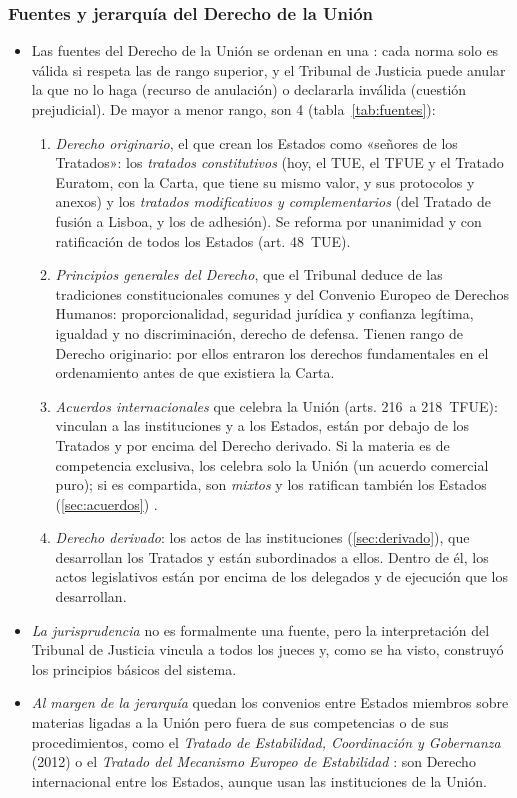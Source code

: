 \documentclass[11pt]{article}
\begin{document}
\subsubsection{Fuentes y jerarquía del Derecho de la Unión}\label{sec:fuentes}

\begin{itemize}
\item Las fuentes del Derecho de la Unión se ordenan en una : cada norma solo es válida si respeta las de rango superior, y el Tribunal de Justicia puede anular la que no lo haga (recurso de anulación) o declararla inválida (cuestión prejudicial). De mayor a menor rango, son 4 (tabla~\ref{tab:fuentes}):
  \begin{enumerate}
  \item \emph{Derecho originario}, el que crean los Estados como «señores de los Tratados»: los \emph{tratados constitutivos} (hoy, el TUE, el TFUE y el Tratado Euratom, con la Carta, que tiene su mismo valor, y sus protocolos y anexos) y los \emph{tratados modificativos y complementarios} (del Tratado de fusión a Lisboa, y los de adhesión). Se reforma por unanimidad y con ratificación de todos los Estados (art. 48~TUE).
  \item \emph{Principios generales del Derecho}, que el Tribunal deduce de las tradiciones constitucionales comunes y del Convenio Europeo de Derechos Humanos: proporcionalidad, seguridad jurídica y confianza legítima, igualdad y no discriminación, derecho de defensa. Tienen rango de Derecho originario: por ellos entraron los derechos fundamentales en el ordenamiento antes de que existiera la Carta.
  \item \emph{Acuerdos internacionales} que celebra la Unión (arts. 216~a 218~TFUE): vinculan a las instituciones y a los Estados, están por debajo de los Tratados y por encima del Derecho derivado. Si la materia es de competencia exclusiva, los celebra solo la Unión (un acuerdo comercial puro); si es compartida, son \emph{mixtos} y los ratifican también los Estados (\ref{sec:acuerdos}) .
  \item \emph{Derecho derivado}: los actos de las instituciones (\ref{sec:derivado}), que desarrollan los Tratados y están subordinados a ellos. Dentro de él, los actos legislativos están por encima de los delegados y de ejecución que los desarrollan.
  \end{enumerate}
\item \emph{La jurisprudencia} no es formalmente una fuente, pero la interpretación del Tribunal de Justicia vincula a todos los jueces y, como se ha visto, construyó los principios básicos del sistema.
\item \emph{Al margen de la jerarquía} quedan los convenios entre Estados miembros sobre materias ligadas a la Unión pero fuera de sus competencias o de sus procedimientos, como el \emph{Tratado de Estabilidad, Coordinación y Gobernanza} (2012) o el \emph{Tratado del Mecanismo Europeo de Estabilidad} : son Derecho internacional entre los Estados, aunque usan las instituciones de la Unión.
\end{itemize}
\end{document}
